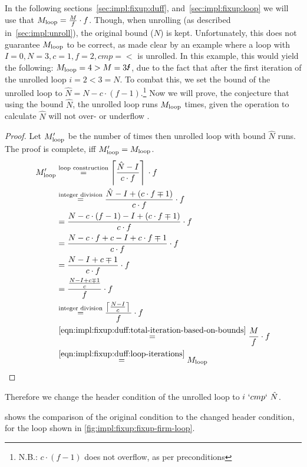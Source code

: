 In the following sections~\ref{sec:impl:fixup:duff}, and~\ref{sec:impl:fixup:loop} we will use that $M_{\text{loop}} = \frac{M}{f} \cdot f$.
Though, when unrolling (as described in~\cref{sec:impl:unroll}), the original bound ($N$) is kept.
Unfortunately, this does not guarantee $M_{\text{loop}}$ to be correct, as made clear by an example where a loop with $I = 0, N = 3, c = 1, f = 2, cmp = <$ is unrolled.
In this example, this would yield the following: $\Mloop = 4 > M = 3 \mLightning$, due to the fact that after the first iteration of the unrolled loop $i = 2 < 3 = N$.
To combat this, we set the bound of the unrolled loop to $\hat{N} = N - c \cdot (f - 1)$.\footnote{N.B.: $c \cdot (f - 1)$ does not overflow, as per preconditions}
Now we will prove, the conjecture that using the bound $\hat{N}$, the unrolled loop runs $M_{\text{loop}}$ times, given the operation to calculate $\hat{N}$ will not over- or underflow .
\begin{proof}
    Let $M_{\text{loop}}'$ be the number of times then unrolled loop with bound $\hat{N}$ runs.
    The proof is complete, iff $M_{\text{loop}}' = M_{\text{loop}}$.
    \begin{align*}
        M_{\text{loop}}' &\overset{\text{loop construction}}{=} \left\lceil{}\frac{\hat{N} - I}{c \cdot f}\right\rceil{} \cdot f\\
        &\overset{\text{integer division}}{=} \frac{\hat{N} - I + (c \cdot f \mp 1)}{c \cdot f} \cdot f\\
        &= \frac{N - c \cdot (f - 1) - I + (c \cdot f \mp 1)}{c \cdot f} \cdot f\\
        &= \frac{N - c \cdot f + c - I + c \cdot f \mp 1}{c \cdot f} \cdot f\\
        &= \frac{N - I + c \mp 1}{c \cdot f} \cdot f\\
        &= \frac{\frac{N - I + c \mp 1}{c}}{f} \cdot f\\
        &\overset{\text{integer division}}{=} \frac{\left\lceil{}\frac{N - I}{c}\right\rceil{}}{f} \cdot f\\
        &\overset{\ref{eqn:impl:fixup:duff:total-iteration-based-on-bounds}}{=} \frac{M}{f} \cdot f\\
        &\overset{\ref{eqn:impl:fixup:duff:loop-iterations}}{=} M_{\text{loop}}
    \end{align*}
\end{proof}

Therefore we change the header condition of the unrolled loop to $i~`cmp`~\hat{N}$.

 shows the comparison of the original condition to the changed header condition, for the loop shown in \cref{fig:impl:fixup:fixup-firm-loop}.

